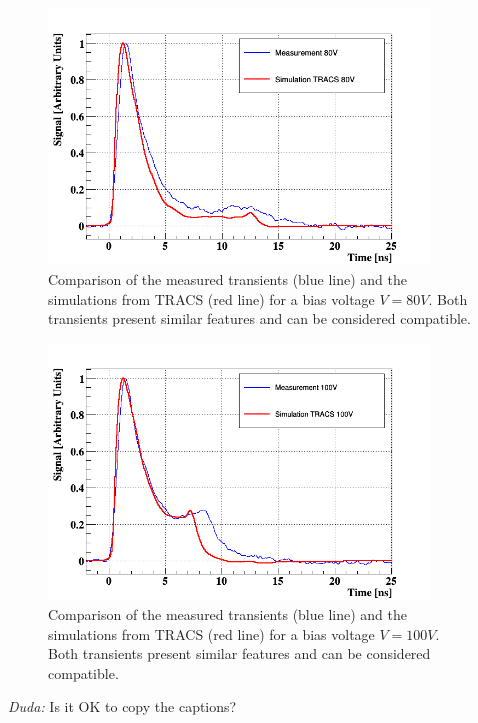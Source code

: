 \begin{figure}[H]
	\centering
	\includegraphics[width=0.9\textwidth]{80V.png}
	\caption{Comparison of the measured transients (blue line) and the simulations from TRACS (red line) for a bias voltage $V = 80V$. Both transients present similar features and can be considered compatible.}
	\label{fig:80v} 
\end{figure}


\begin{figure}[H]
	\centering
	\includegraphics[width=0.9\textwidth]{100V.png}
	\caption{Comparison of the measured transients (blue line) and the simulations from TRACS (red line) for a bias voltage $V = 100V$. Both transients present similar features and can be considered compatible.}
	\label{fig:100v}
\end{figure}

\emph{Duda: } Is it OK to copy the captions?

